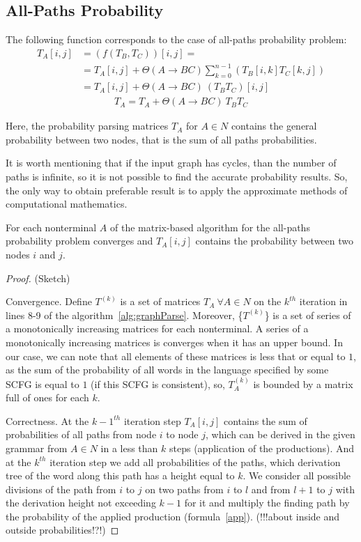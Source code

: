 \documentclass[sigconf, 10pt]{acmart}
\begin{document}
\subsection{All-Paths Probability}

The following function corresponds to the case of all-paths probability problem:
\begin{align}
\label{app}
    T_A[i,j] &= (f(T_B, T_C))[i,j] = \\
             &= T_A[i,j] + \Theta(A \to BC) \sum_{k=0}^{n-1} (T_B[i,k]T_C[k,j]) \nonumber \\
             &= T_A[i,j] + \Theta(A \to BC) \ (T_BT_C)[i, j] \nonumber
\end{align}
\begin{align}
    T_A = T_A + \Theta(A \to BC) \ T_BT_C
\end{align}

Here, the probability parsing matrices $T_A$ for $A \in N$ contains the general probability between two nodes, that is the sum of all paths probabilities.

It is worth mentioning that if the input graph has cycles, than the number of paths is infinite, so it is not possible to find the accurate probability results. So, the only way to obtain preferable result is to apply the approximate methods of computational mathematics. 

\begin{theorem}
For each nonterminal $A$ of the matrix-based algorithm for the all-paths probability problem converges and $T_A[i,j]$ contains the probability between two nodes $i$ and $j$. 
\label{convergetheorem}
\end{theorem}

\begin{proof} {\color{red}(Sketch)}

Convergence. Define $T^{(k)}$ is a set of matrices $T_A \ \forall A \in N$ on the $k^{th}$ iteration in lines 8-9 of the algorithm~\ref{alg:graphParse}. Moreover, \{$T^{(k)}$\} is a set of series of a monotonically increasing matrices for each nonterminal. A series of a monotonically increasing matrices is converges when it has an upper bound. In our case, we can note that all elements of these matrices is less that or equal to $1$, as the sum of the probability of all words in the language specified by some SCFG is equal to $1$ (if this SCFG is consistent), so, $T_A^{(k)}$ is bounded by a matrix full of ones for each $k$.

Correctness. At the $k-1^{th}$ iteration step $T_A[i, j]$ contains the sum of probabilities of all paths from node $i$ to node $j$, which can be derived in the given grammar from $A \in N$ in a less than $k$ steps (application of the productions). And at the $k^{th}$ iteration step we add all probabilities of the paths, which derivation tree of the word along this path has a height equal to $k$. We consider all possible divisions of the path from $i$ to $j$ on two paths  from $i$ to $l$ and  from $l+1$ to $j$ with the derivation height not exceeding $k-1$ for it and multiply the finding path by the probability of the applied production (formula~\ref{app}).
{\color{red}(!!!about inside and outside probabilities!?!)}
\end{proof}
\end{document}
